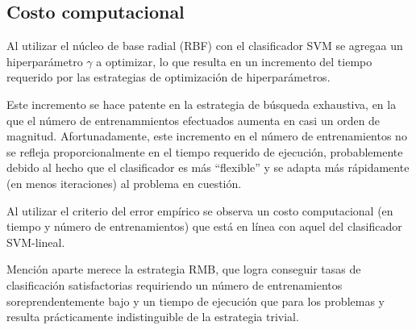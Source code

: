 %
%
\subsection{Costo computacional}
%
Al utilizar el núcleo de base radial (RBF) con el clasificador SVM se
agregaa un hiperparámetro $\gamma$ a optimizar, lo que resulta en un
incremento del tiempo requerido por las estrategias de optimización
de hiperparámetros.

Este incremento se hace patente en la estrategia de búsqueda
exhaustiva, en la que el número de entrenammientos efectuados aumenta
en casi un orden de magnitud.
Afortunadamente, este incremento en el número de entrenamientos no se
refleja proporcionalmente en el tiempo requerido de ejecución,
probablemente debido al hecho que el clasificador es más ``flexible''
y se adapta más rápidamente (en menos iteraciones) al problema en
cuestión.

Al utilizar el criterio del error empírico se observa un costo
computacional (en tiempo y número de entrenamientos) que está en línea
con aquel del clasificador SVM-lineal.

Mención aparte merece la estrategia RMB, que logra conseguir tasas de
clasificación satisfactorias requiriendo un número de entrenamientos
soreprendentemente bajo y un tiempo de ejecución que para los
problemas \tripletsvm{} y \mipred{} resulta prácticamente
indistinguible de la estrategia trivial.
